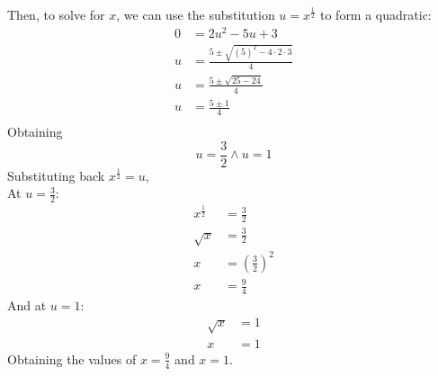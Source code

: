 \documentclass[hidelinks, a4paper, 12pt]{article}
\newcommand{\n}{\\[\baselineskip]}
\begin{document}
            Then, to solve for $x$, we can use the substitution $u = x^{\frac{1}{2}}$ to form a quadratic:
            \[\begin{split}
                0 &= 2u^2 - 5u + 3\\
                u &= \frac{5 \pm \sqrt{(5)^2 - 4 \cdot 2 \cdot 3}}{4}\\
                u &= \frac{5 \pm \sqrt{25 - 24}}{4}\\
                u &= \frac{5 \pm 1}{4}\\
            \end{split}\]
            Obtaining
            \[u = \frac{3}{2} \land u = 1\]
            Substituting back $x^{\frac{1}{2}} = u$,\n
            At $u = \frac{3}{2}$:
            \[\begin{split}
                x^{\frac{1}{2}} &= \frac{3}{2}\\
                \sqrt{x} &= \frac{3}{2}\\
                x &= \left(\frac{3}{2}\right)^2\\
                x &= \frac{9}{4}
            \end{split}\]
            And at $u = 1$:
            \[\begin{split}
                \sqrt{x} &= 1\\
                x &= 1
            \end{split}\]
            Obtaining the values of $x = \frac{9}{4}$ and $x = 1$.
    
    
\end{document}
